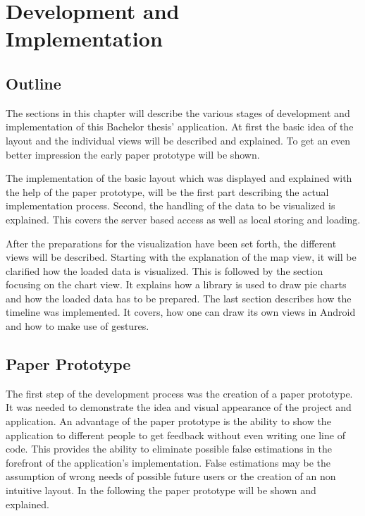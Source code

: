\chapter{Development and\\Implementation}
\label{cha:implementation}

\section{Outline}
The sections in this chapter will describe the various stages of development and implementation of this Bachelor thesis' application. At first the basic idea of the layout and the individual views will be described and explained. To get an even better impression the early paper prototype will be shown.

The implementation of the basic layout which was displayed and explained with the help of the paper prototype, will be the first part describing the actual implementation process.
Second, the handling of the data to be visualized is explained. This covers the server based access as well as local storing and loading. 

After the preparations for the visualization have been set forth, the different views will be described. Starting with the explanation of the map view, it will be clarified how the loaded data is visualized. This is followed by the section focusing on the chart view. It explains how a library is used to draw pie charts and how the loaded data has to be prepared. The last section describes how the timeline was implemented. It covers, how one can draw its own views in Android and how to make use of gestures.
\newpage
\section{Paper Prototype}
\label{sec:paper_prototype}
The first step of the development process was the creation of a paper prototype. It was needed to demonstrate the idea and visual appearance of the project and application. An advantage of the paper prototype is the ability to show the application to different people to get feedback without even writing one line of code. This provides the ability to eliminate possible false estimations  in the forefront of the application's implementation. False estimations may be the assumption of wrong needs of possible future users or the creation of an non intuitive layout. In the following the paper prototype will be shown and explained.

